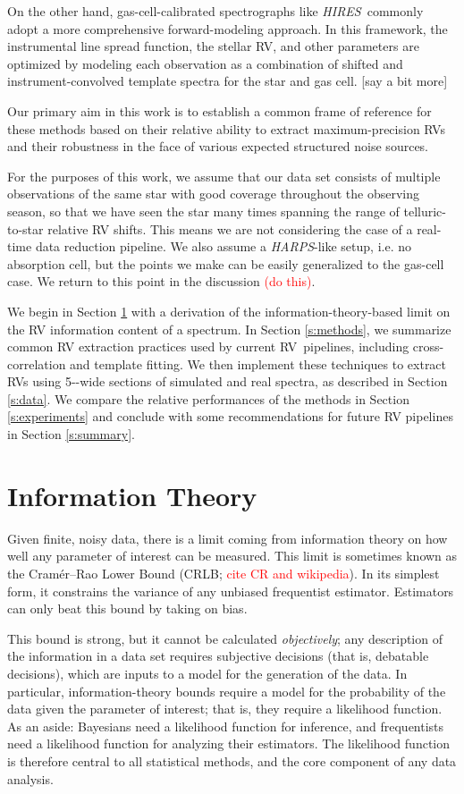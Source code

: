\documentclass[modern]{aastex62}
\newcommand{\ang}{\text{\normalfont\AA}}
\newcommand{\todo}[1]{\textcolor{red}{#1}}  %
\newcommand{\acronym}[1]{{\small{#1}}}
\newcommand{\project}[1]{\textsl{#1}}
\newcommand{\HARPS}{\project{\acronym{HARPS}}}
\newcommand{\HIRES}{\project{\acronym{HIRES}}}
\newcommand{\RV}{\acronym{RV}}
\newcommand{\CRLB}{\acronym{CRLB}}
\begin{document}
On the other hand, gas-cell-calibrated spectrographs like \HIRES\ commonly adopt a more comprehensive forward-modeling approach. 
In this framework, the instrumental line spread function, the stellar RV, and other parameters are optimized by modeling each observation as a combination of shifted and instrument-convolved template spectra for the star and gas cell. [say a bit more]

Our primary aim in this work is to establish a common frame of reference for these methods based on their relative ability to extract maximum-precision RVs and their robustness in the face of various expected structured noise sources.

For the purposes of this work, we assume that our data set consists of multiple observations of the same star with good coverage throughout the observing season, so that we have seen the star many times spanning the range of telluric-to-star relative RV shifts. 
This means we are not considering the case of a real-time data reduction pipeline. 
We also assume a \HARPS-like setup, i.e. no absorption cell, but the points we make can be easily generalized to the gas-cell case. 
We return to this point in the discussion \todo{(do this)}.

We begin in Section \ref{s:info} with a derivation of the information-theory-based limit on the RV information content of a spectrum. 
In Section \ref{s:methods}, we summarize common RV extraction practices used by current \RV\ pipelines, including cross-correlation and template fitting. 
We then implement these techniques to extract \RV s using 5-\ang-wide sections of simulated and real spectra, as described in Section \ref{s:data}. 
We compare the relative performances of the methods in Section \ref{s:experiments} and conclude with some recommendations for future RV pipelines in Section \ref{s:summary}. 

\section{Information Theory}
\label{s:info}

Given finite, noisy data, there is a limit coming from information
theory on how well any parameter of interest can be measured.
This limit is
sometimes known as the Cram\'er--Rao Lower Bound (\CRLB; \todo{cite CR and wikipedia}).
In its simplest form, it constrains the variance of any unbiased
frequentist estimator.
Estimators can only beat this bound by taking on bias.

This bound is strong, but it cannot be calculated \emph{objectively};
any description of the information in a data set requires
subjective decisions (that is, debatable decisions), which are inputs
to a model for the generation of the data.
In particular, information-theory bounds require a model for the
probability of the data given the parameter of interest; that is, they
require a likelihood function.
As an aside: Bayesians need a likelihood function for inference, and
frequentists need a likelihood function for analyzing their estimators.
The likelihood function is therefore central to all statistical methods,
and the core component of any data analysis.
\end{document}
